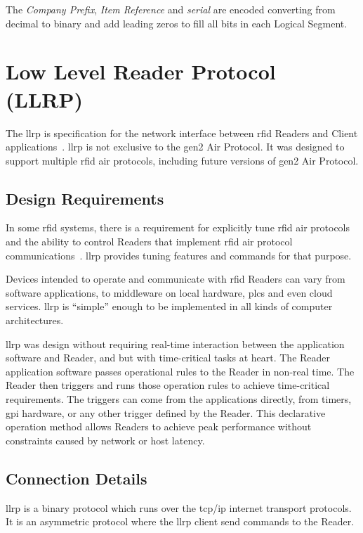The \emph{Company Prefix}, \emph{Item Reference} and \emph{serial} are encoded converting from decimal to binary and add leading zeros to fill all bits in each Logical Segment.

\section{Low Level Reader Protocol (LLRP)}

The \acf{llrp} is specification for the network interface between \ac{rfid} Readers and Client applications~\cite{ImpinjLTKProgrammers}. \ac{llrp} is not exclusive to the \ac{gen2} Air Protocol. It was designed to support multiple \ac{rfid} air protocols, including future versions of \ac{gen2} Air Protocol.

\subsection{Design Requirements}

In some \ac{rfid} systems, there is a requirement for explicitly tune \ac{rfid} air protocols and the ability to control Readers that implement \ac{rfid} air protocol communications~\cite{LowLevelReader}. \ac{llrp} provides tuning features and commands for that purpose.

Devices intended to operate and communicate with \ac{rfid} Readers can vary from software applications, to middleware on local hardware, \acp{plc} and even cloud services. \ac{llrp} is ``simple'' enough to be implemented in all kinds of computer architectures.

\ac{llrp} was design without requiring real-time interaction between the application software and Reader, and but with time-critical tasks at heart. 
The Reader application software passes operational rules to the Reader in non-real time.
The Reader then triggers and runs those operation rules to achieve time-critical requirements. 
The triggers can come from the applications directly, from timers, \ac{gpi} hardware, or any other trigger defined by the Reader. 
This declarative operation method allows Readers to achieve peak performance without constraints caused by network or host latency.

\subsection{Connection Details}

\ac{llrp} is a binary protocol which runs over the \acs{tcp}/\acs{ip} internet transport protocols.
It is an asymmetric protocol where the \ac{llrp} client send commands to the Reader.

